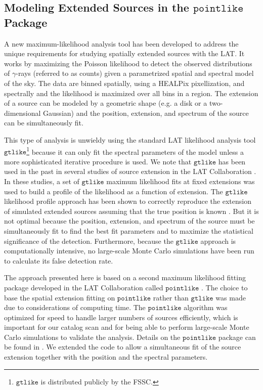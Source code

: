 \documentclass[12pt,preprint]{aastex}
\newcommand{\gtlike}{\ensuremath{\mathtt{gtlike}}\xspace}
\newcommand{\pointlike}{\ensuremath{\mathtt{pointlike}}\xspace}
\begin{document}
\subsection{Modeling Extended Sources in the \pointlike Package}

A new maximum-likelihood analysis tool has been developed to address the
unique requirements for studying spatially extended sources with the LAT.
It works by maximizing the Poisson 
likelihood to detect the observed distributions of $\gamma$-rays (referred to as counts)
given a parametrized spatial and spectral model of the sky.  
The data are binned spatially, using a HEALPix pixellization, and spectrally 
\citep{healpix} and the likelihood is maximized over all bins in
a region.
The extension of a source can be modeled by a geometric shape
(e.g. a disk or a two-dimensional Gaussian) and the position, extension,
and spectrum of the source can be simultaneously fit.

This type of analysis is unwieldy using the standard LAT likelihood
analysis tool \gtlike\footnote{\gtlike is distributed publicly by the
FSSC.} because it can only fit the spectral parameters of the model
unless a more sophisticated iterative procedure is used.  
We note that \gtlike has been used in the
past in several studies of source extension in the LAT Collaboration
\citep{lmc,smc,w28,w51c}.  In these studies, a 
set of \gtlike maximum likelihood fits at fixed extensions was used
to build a profile of the likelihood as a function of extension.
The \gtlike likelihood profile approach has been shown to correctly
reproduce the extension of simulated extended sources assuming that the
true position is known \citep{francesco_2011}.  But it is not optimal
because the position, extension, and spectrum of the source must be
simultaneously fit to find the best fit parameters and to maximize the
statistical significance of the detection.  Furthermore, because the \gtlike
approach is computationally intensive, no large-scale Monte Carlo
simulations have been run to calculate its false detection rate.

The approach presented here is based on a second maximum likelihood
fitting package developed in the LAT Collaboration called \pointlike
\citep{first_cat,matthew_kerr_thesis}.  The choice to base the
spatial extension fitting on \pointlike rather than \gtlike was made
due to considerations of computing time.  The \pointlike algorithm was
optimized for speed to handle larger numbers of sources efficiently,
which is important for our catalog scan and for being able
to perform large-scale Monte Carlo simulations to validate the analysis.
Details on the \pointlike package can be
found in \cite{matthew_kerr_thesis}.  We extended the code to allow a
simultaneous fit of the source extension together with the position and
the spectral parameters.
\end{document}
